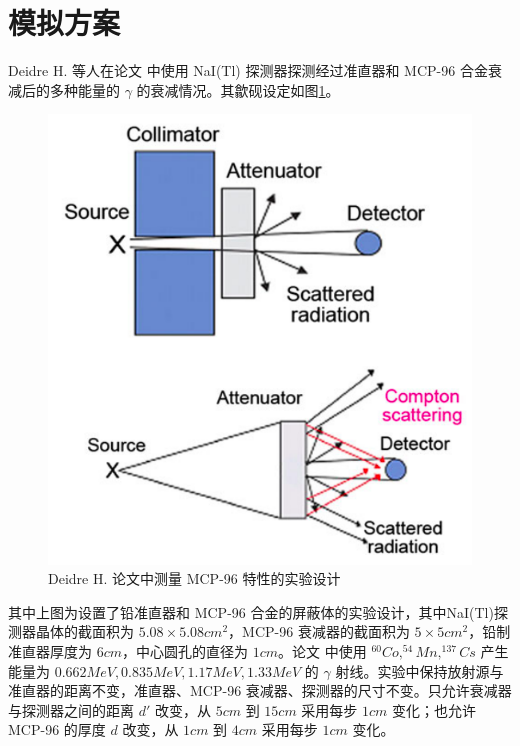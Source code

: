 \section{模拟方案}

Deidre H. 等人在论文\cite{hopkins_linear_2012} 中使用 NaI(Tl) 探测器探测经过准直器和 MCP-96 合金衰减后的多种能量的 $\gamma$ 的衰减情况。其歙砚设定如图\ref{fig:hopkins}。

\begin{figure}[H]
    \centering
    \includegraphics[width=\linewidth]{figures/hopkins.png}
    \caption{Deidre H. 论文中测量 MCP-96 特性的实验设计}
    \label{fig:hopkins}
\end{figure}

其中上图为设置了铅准直器和 MCP-96 合金的屏蔽体的实验设计，其中NaI(Tl)探测器晶体的截面积为 $5.08\times5.08\si{cm^2}$，MCP-96 衰减器的截面积为 $5\times5\si{cm^2}$，铅制准直器厚度为 $6\si{cm}$，中心圆孔的直径为 $1\si{cm}$。论文\cite{hopkins_linear_2012} 中使用 $^{60}Co,^{54}Mn,^{137}Cs$ 产生能量为 $0.662\si{MeV},0.835\si{MeV},1.17\si{MeV},1.33\si{MeV}$ 的 $\gamma$ 射线。实验中保持放射源与准直器的距离不变，准直器、MCP-96 衰减器、探测器的尺寸不变。只允许衰减器与探测器之间的距离 $d'$ 改变，从 $5\si{cm}$ 到 $15\si{cm}$ 采用每步 $1\si{cm}$ 变化；也允许 MCP-96 的厚度 $d$ 改变，从 $1\si{cm}$ 到 $4\si{cm}$ 采用每步 $1\si{cm}$ 变化。

